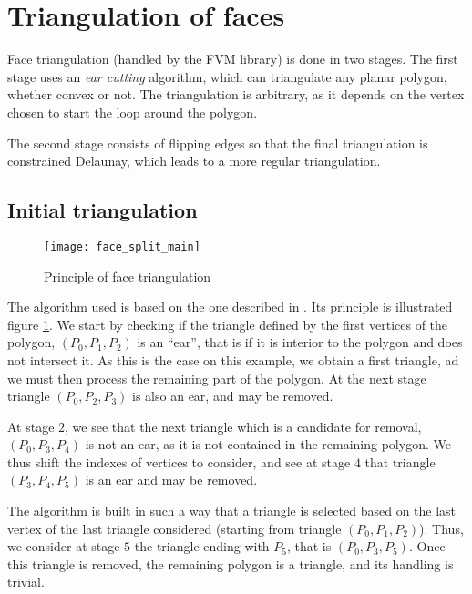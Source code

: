 \section*{Triangulation of faces\label{sec:triangle}}

Face triangulation (handled by the FVM library) is done in two
stages. The first stage uses an \emph{ear cutting} algorithm, which
can triangulate any planar polygon, whether convex or not.
The triangulation is arbitrary, as it depends on the vertex chosen
to start the loop around the polygon.

The second stage consists of flipping edges so that the final
triangulation is constrained Delaunay, which leads to a
more regular triangulation.

\subsection*{Initial triangulation\label{sec:triangle_ini}}

\begin{figure}[!h]
\centerline{
\texttt{[image: face\_split\_main]}}
\caption{Principle of face triangulation}
\label{fig:algo.ear_splitting}
\end{figure}

The algorithm used is based on the one described in \cite{triangl1}.
Its principle is illustrated figure \ref{fig:algo.ear_splitting}.
We start by checking if the triangle defined by the first vertices
of the polygon, $(P_0, P_1, P_2)$ is an ``ear'', that is if it is
interior to the polygon and does not intersect it. As this is the case
on this example, we obtain a first triangle, ad we must then process
the remaining part of the polygon. At the next stage triangle
$(P_0, P_2, P_3)$ is also an ear, and may be removed.

At stage $2$, we see that the next triangle which is a candidate for
removal, $(P_0, P_3, P_4)$ is not an ear, as it is not contained in the
remaining polygon. We thus shift the indexes of vertices to consider,
and see at stage $4$ that triangle $(P_3, P_4, P_5)$
is an ear and may be removed.

The algorithm is built in such a way that a triangle is selected based on
the last vertex of the last triangle considered (starting from triangle
$(P_0, P_1, P_2)$). Thus, we consider at stage $5$ the triangle ending
with $P_5$, that is $(P_0, P_3, P_5)$.
Once this triangle is removed, the remaining polygon is a triangle,
and its handling is trivial.


